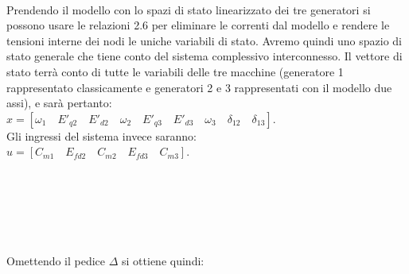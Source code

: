 \documentclass[Lau,noexaminfo]{sapthesis}
\begin{document}
	\\
	Prendendo il modello con lo spazi di stato linearizzato dei tre generatori si possono usare le relazioni 2.6 per eliminare le correnti dal modello e rendere le tensioni interne dei nodi le uniche variabili di stato. Avremo quindi uno spazio di stato generale che tiene conto del sistema complessivo interconnesso. Il vettore di stato terrà conto di tutte le variabili delle tre macchine (generatore 1 rappresentato classicamente e generatori 2 e 3 rappresentati con il modello due assi), e sarà pertanto:\\
	$x=[\omega_1 \quad E'_{q2} \quad E'_{d2} \quad \omega_2 \quad E'_{q3} \quad E'_{d3} \quad \omega_3 \quad \delta_{12} \quad \delta_{13}]$.\\
	Gli ingressi del sistema invece saranno:\\
	$u=[C_{m1} \quad E_{fd2} \quad C_{m2} \quad E_{fd3} \quad C_{m3}]$.\\\\\\\\\\\\\\
	Omettendo il pedice $\Delta$ si ottiene quindi:
\end{document}
